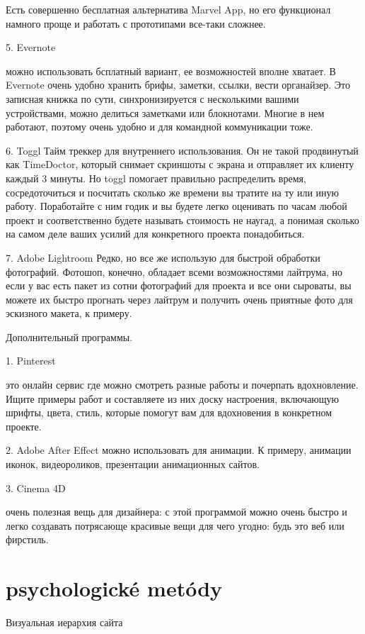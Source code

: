 \documentclass[10pt,twoside,slovak,a4paper]{article}
\begin{document}
Есть совершенно бесплатная альтернатива Marvel App, но его функционал намного проще и работать с прототипами все-таки сложнее.


5. Evernote

можно использовать бсплатный вариант, ее возможностей вполне хватает. В Evernote очень удобно хранить брифы, заметки, ссылки, вести органайзер. Это записная книжка по сути, синхронизируется с несколькими вашими устройствами, можно делиться заметками или блокнотами. Многие в нем работают, поэтому очень удобно и для командной коммуникации тоже.

6. Toggl
Тайм треккер для внутреннего использования. Он не такой продвинутый как TimeDoctor, который снимает скриншоты с экрана и отправляет их клиенту каждый 3 минуты. Но toggl помогает правильно распределить время, сосредоточиться и посчитать сколько же времени вы тратите на ту или иную работу. Поработайте с ним годик и вы будете легко оценивать по часам любой проект и соответственно будете называть стоимость не наугад, а понимая сколько на самом деле ваших усилий для конкретного проекта понадобиться.

7. Adobe Lightroom
Редко, но все же использую для быстрой обработки фотографий. Фотошоп, конечно, обладает всеми возможностями лайтрума, но если у вас есть пакет из сотни фотографий для проекта и все они сыроваты, вы можете их быстро прогнать через лайтрум и получить очень приятные фото для эскизного макета, к примеру.

Дополнительный программы.

1. Pinterest

это онлайн сервис где можно смотреть разные работы и почерпать вдохновление.
Ищите примеры работ и составляете из них доску настроения, включающую шрифты, цвета, стиль, которые помогут вам для вдохновения в конкретном проекте.

2. Adobe After Effect
можно использовать для анимации. К примеру, анимации иконок, видеороликов, презентации анимационных сайтов.

3. Cinema 4D

очень полезная вещь для дизайнера: с этой программой можно очень быстро и легко создавать потрясающе красивые вещи для чего угодно: будь это веб или фирстиль.

\section{psychologické metódy}

Визуальная иерархия сайта\newline
\newline
\end{document}
